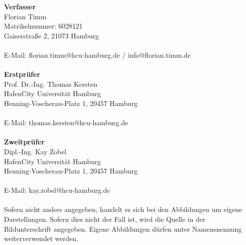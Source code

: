 \documentclass[a4paper,12pt,bibliography=totoc, listof=totoc, titlepage]{scrreprt}
\begin{document}
\vspace{1cm}
\noindent\textbf{\large Verfasser}\\
Florian Timm\\
Matrikelnummer: 6028121\\
Gaiserstraße 2, 21073 Hamburg\\
\\
E-Mail: florian.timm@hcu-hamburg.de / info@florian.timm.de \\
\vspace{2cm}\\
\noindent\textbf{\large Erstprüfer}\\
Prof. Dr.-Ing. Thomas Kersten\\
HafenCity Universität Hamburg\\
Henning-Voscherau-Platz 1, 20457 Hamburg\\
\\
E-Mail: thomas.kersten@hcu-hamburg.de\\
\vspace{2cm}\\
\textbf{\large Zweitprüfer}\\
Dipl.-Ing. Kay Zobel\\
HafenCity Universität Hamburg\\
Henning-Voscherau-Platz 1, 20457 Hamburg\\
\\
E-Mail: kay.zobel@hcu-hamburg.de\\
\vspace{4cm}\\
Sofern nicht anders angegeben, handelt es sich bei den Abbildungen um eigene Darstellungen. Sofern dies nicht der Fall ist, wird die Quelle in der Bildunterschrift angegeben. Eigene Abbildungen dürfen unter Namensnennung weiterverwendet werden.
\newpage
\end{document}
